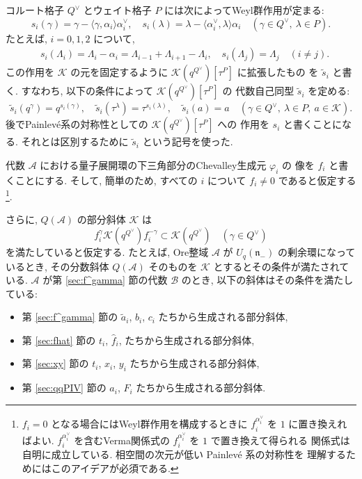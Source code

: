 \documentclass[12pt,twoside,dvipdfm]{msjproc}
\theoremstyle{definition} %
\theoremstyle{definition} %
\theoremstyle{definition} %
\numberwithin{theorem}{section}
\numberwithin{equation}{section}
\numberwithin{figure}{section}
\numberwithin{table}{section}
\newcommand\secref[1]{第 \ref{#1} 節}
\newcommand\nil{\mathfrak{n}}
\newcommand\bra{\langle}
\newcommand\ket{\rangle}
\newcommand\A{\mathcal{A}}
\newcommand\K{\mathcal{K}}
\newcommand\B{\mathcal{B}}
\newcommand\ta{{\tilde{a}}}
\newcommand\ts{{\tilde{s}}}
\newcommand\hf{{\hat{f}}}
\newcommand\av{\alpha^\vee}
\newcommand\Qv{{Q^\vee}}
\begin{document}
コルート格子 $\Qv$ とウェイト格子 $P$ には次によってWeyl群作用が定まる:
\begin{equation*}
 s_i(\gamma) = \gamma - \bra\gamma,\alpha_i\ket\av_i, \quad
 s_i(\lambda)=\lambda - \bra\av_i,\lambda\ket\alpha_i \quad
 (\gamma\in\Qv,\ \lambda\in P).
\end{equation*}
たとえば, $i=0,1,2$ について, 
\begin{align*}
 &
 s_i(\Lambda_i) = \Lambda_i-\alpha_i = \Lambda_{i-1}+\Lambda_{i+1}-\Lambda_i,
 \quad
 s_i(\Lambda_j) = \Lambda_j \quad (i\ne j).
\end{align*}
この作用を $\K$ の元を固定するように $\K(q^\Qv)[\tau^P]$ に拡張したもの
を $\ts_i$ と書く. すなわち, 以下の条件によって $\K(q^\Qv)[\tau^P]$ の
代数自己同型 $\ts_i$ を定める:
\begin{equation*}
 \ts_i(q^\gamma)=q^{s_i(\gamma)}, \quad
 \ts_i(\tau^\lambda)=\tau^{s_i(\lambda)}, \quad
 \ts_i(a) = a \quad
 (\gamma\in\Qv,\ \lambda\in P,\ a\in\K).
\end{equation*}
後でPainlev\'e系の対称性としての $\K(q^\Qv)[\tau^P]$ への
作用を $s_i$ と書くことになる.
それとは区別するために $\ts_i$ という記号を使った.

代数 $\A$ における量子展開環の下三角部分のChevalley生成元 $\varphi_i$ の
像を $f_i$ と書くことにする.
そして, 簡単のため, すべての $i$ について $f_i\ne 0$ であると仮定する%
\footnote{$f_i=0$ となる場合にはWeyl群作用を構成するときに $f_i^{\av_i}$ を
$1$ に置き換えればよい.  
$f_i^{\av_i}$ を含むVerma関係式の $f_i^{\av_i}$ を $1$ で置き換えて得られる
関係式は自明に成立している. 相空間の次元が低い Painlev\'e 系の対称性を
理解するためにはこのアイデアが必須である.}.

さらに, $Q(\A)$ の部分斜体 $\K$ は 
\begin{equation*}
  f_i^\gamma \K(q^\Qv) f_i^{-\gamma} \subset \K(q^\Qv)
  \quad (\gamma\in\Qv)
\end{equation*}
を満たしていると仮定する. 
たとえば, Ore整域 $\A$ が $U_q(\nil_-)$ の剰余環になっているとき, 
その分数斜体 $Q(\A)$ そのものを $\K$ とするとその条件が満たされている.
$\A$ が\secref{sec:f^gamma}の代数 $\B$ のとき, 
以下の斜体はその条件を満たしている:
\begin{itemize}
\item \secref{sec:f^gamma}の $\ta_i$, $b_i$, $c_i$ たちから生成される部分斜体,
\item \secref{sec:fhat}の $t_i$, $\hf_i$, たちから生成される部分斜体,
\item \secref{sec:xy}の $t_i$, $x_i$, $y_i$ たちから生成される部分斜体,
\item \secref{sec:qqPIV}の $a_i$, $F_i$ たちから生成される部分斜体.
\end{itemize}
\end{document}
